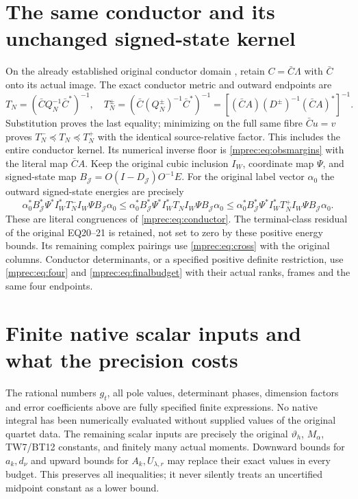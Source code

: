 \documentclass[11pt]{article}
\begin{document}
\section{The same conductor and its unchanged signed-state kernel}

On the already established original conductor domain \cite{mprec:TR},
retain $C=\bar C\Lambda$ with $\bar C$ onto its actual image.
The exact conductor metric and outward endpoints are
\begin{equation}\label{mprec:eq:conductor}
 T_N=(\bar C Q_N^{-1}\bar C^*)^{-1},\quad
 T_N^\pm=(\bar C(Q_N^\pm)^{-1}\bar C^*)^{-1}
       =[(\bar CA)(D^\pm)^{-1}(\bar CA)^*]^{-1}.
\end{equation}
Substitution proves the last equality; minimizing on the full same
fibre $\bar Cu=v$ proves $T_N^-\preceq T_N\preceq T_N^+$
with the identical source-relative factor. This includes the entire
conductor kernel. Its numerical inverse floor is
\eqref{mprec:eq:obsmargins} with the literal map $\bar CA$.
Keep the original cubic inclusion $I_W$, coordinate map $\Psi$,
and signed-state map $B_{\mathcal J}=O(I-D_{\mathcal J})O^{-1}E$.
For the original label vector $\alpha_0$ the outward signed-state
energies are precisely
\[
 \alpha_0^*B_{\mathcal J}^*\Psi^*I_W^*T_N^-I_W\Psi
               B_{\mathcal J}\alpha_0
 \le\alpha_0^*B_{\mathcal J}^*\Psi^*I_W^*T_NI_W\Psi
               B_{\mathcal J}\alpha_0
 \le\alpha_0^*B_{\mathcal J}^*\Psi^*I_W^*T_N^+I_W\Psi
               B_{\mathcal J}\alpha_0.
\]
These are literal congruences of \eqref{mprec:eq:conductor}. The
terminal-class residual of the original EQ20--21 is retained,
not set to zero by these positive energy bounds. Its remaining
complex pairings use \eqref{mprec:eq:cross} with the original columns.
Conductor determinants, or a specified positive definite
restriction, use \eqref{mprec:eq:four} and \eqref{mprec:eq:finalbudget} with
their actual ranks, frames and the same four endpoints.

\section{Finite native scalar inputs and what the precision costs}

The rational numbers $g_t$, all pole values, determinant phases,
dimension factors and error coefficients above are fully specified
finite expressions. No native integral has been numerically
evaluated without supplied values of the original quartet data.
The remaining scalar inputs are precisely the original
$\vartheta_h$, $M_\alpha$, TW7/BT12 constants, and finitely many
actual moments. Downward bounds for $a_k,d_\nu$ and upward bounds
for $A_k,U_{\lambda,r}$ may replace their exact values in every
budget. This preserves all inequalities; it never silently treats
an uncertified midpoint constant as a lower bound.
\end{document}
